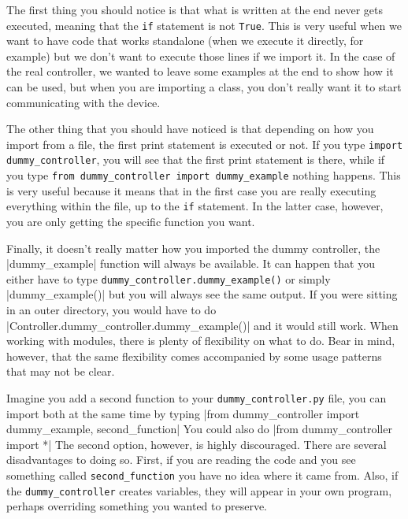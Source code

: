 The first thing you should notice is that what is written at the end never gets executed, meaning that the \texttt{if} statement is not
\texttt{True}. This is very useful when we want to have code that works standalone (when we execute it directly, for example) but we don't want to execute those lines if we import it. In the case of the real controller, we wanted to leave some examples at the end to show how it can be used, but when you are importing a class, you don't really want it to start communicating with the device.

The other thing that you should have noticed is that depending on how you import from a file, the first print statement is executed or not. If
you type \texttt{import dummy_controller}, you will see that the first print statement is there, while if you type \texttt{from dummy_controller import dummy_example} nothing happens. This is very useful because it means that in the first case you are really executing everything within the file, up to the \texttt{if} statement. In the latter case, however, you are only getting the specific function you want.

Finally, it doesn't really matter how you imported the dummy controller, the |dummy_example| function will always be available. It can happen that you either have to type \texttt{dummy_controller.dummy_example()} or simply |dummy_example()| but you will always see the same output. If you were sitting in an outer directory, you would have to do |Controller.dummy_controller.dummy_example()| and it would still work. When working with modules, there is plenty of flexibility on what to do. Bear in mind, however, that the same flexibility comes accompanied by some usage patterns that may not be clear.

Imagine you add a second function to your \texttt{dummy_controller.py} file, you can import both at the same time by typing
|from dummy_controller import dummy_example, second_function| You could also do |from dummy_controller import *| The
second option, however, is highly discouraged. There are several disadvantages to doing so. First, if you are reading the code and you
see something called \texttt{second_function} you have no idea where it came from. Also, if the \texttt{dummy_controller} creates variables, they will appear in your own program, perhaps overriding something you wanted to preserve.

